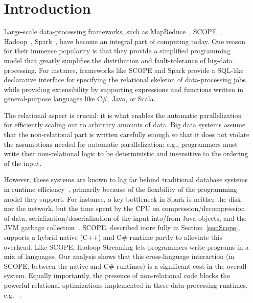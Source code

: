 \section{Introduction \label{sec:intro}}
Large-scale data-processing frameworks, such as MapReduce~\cite{Dean:2008:MSD:1327452.1327492}, SCOPE~\cite{SCOPE}, Hadoop~\cite{Dittrich:2010}, Spark~\cite{zaharia2010spark}, have become an integral part of computing today. One reason for their immense popularity is that they provide a simplified programming model that greatly simplifies the distribution and fault-tolerance of big-data processing. For instance, frameworks like SCOPE and Spark provide a SQL-like declarative interface for specifying the relational skeleton of data-processing jobs while providing extensibility by supporting expressions and functions written in general-purpose languages like C\#, Java, or Scala. 

The relational aspect is crucial: it is what enables the automatic parallelization for efficiently scaling out to arbitrary amounts of data.
Big data systems assume that the non-relational part is written carefully enough so that it does not violate the assumptions needed for automatic parallelization: e.g., programmers must write their non-relational logic to be deterministic and insensitive to the ordering of the input.

However, these systems are known to lag far behind traditional database systems in runtime efficiency~\cite{Jahani:2011,Pavlo:2009}, primarily because of the flexibility of the programming model they support. For instance,  a key bottleneck in Spark is neither the disk nor the network, but the time spent by the CPU on compression/decompression of data, serialization/deserialization of the input into/from Java objects, and the JVM garbage collection~\cite{ousterhout-nsdi15}. SCOPE,  described more fully in Section~\ref{sec:Scope}, supports a hybrid native (C++) and C\# runtime partly to alleviate this overhead.
Like SCOPE, Hadoop Streaming lets programmers write programs in a mix of languages\cite{hadoop_stream}. 
Our analysis shows that this cross-language interaction (in SCOPE, between the native and C\# runtimes) is a significant cost in the overall system.  
Equally importantly, the presence of non-relational code blocks the powerful relational optimizations implemented in these data-processing runtimes, e.g. ~\cite{guo2012spotting}. 


